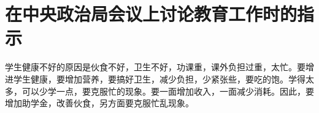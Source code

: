 \section[在中央政治局会议上讨论教育工作时的指示（一九五八年一月三十一日）]{在中央政治局会议上讨论教育工作时的指示}


学生健康不好的原因是伙食不好，卫生不好，功课重，课外负担过重，太忙。要增进学生健康，要增加营养，要搞好卫生，减少负担，少紧张些，要吃的饱。学得太多，可以少学一点，要克服忙的现象。要一面增加收入，一面减少消耗。因此，要增加助学金，改善伙食，另方面要克服忙乱现象。


